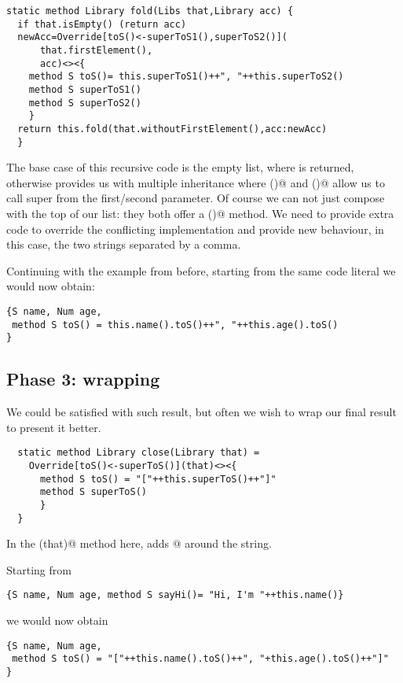 \begin{lstlisting}
static method Library fold(Libs that,Library acc) {
  if that.isEmpty() (return acc)
  newAcc=Override[toS()<-superToS1(),superToS2()](
      that.firstElement(),
      acc)<><{
    method S toS()= this.superToS1()++", "++this.superToS2()
    method S superToS1()
    method S superToS2()
    }
  return this.fold(that.withoutFirstElement(),acc:newAcc)
  }
\end{lstlisting}

The base case of this recursive code is the empty list, where \Q@acc@ is returned,
otherwise \Q@Override@ provides us with multiple inheritance where
()@ and ()@
allow us to call super from the first/second parameter.
Of course we can not just compose \Q@acc@ with the top of our list: they both offer
a \Q@toS()@ method. We need to provide extra code to override the conflicting implementation
and provide new behaviour, in this case, the two strings separated by a comma.

Continuing with the example from before, starting from the same code literal we would now obtain:

\begin{lstlisting}
{S name, Num age,
 method S toS() = this.name().toS()++", "++this.age().toS()
}
\end{lstlisting}

\subsection*{Phase 3: wrapping}
We could be satisfied with such result, but often we wish to wrap our final result
to present it better.

\begin{lstlisting}
  static method Library close(Library that) =
    Override[toS()<-superToS()](that)<><{
      method S toS() = "["++this.superToS()++"]"
      method S superToS()
      }
  }
\end{lstlisting}

  In the \Q@close(that)@ method here, \Q@Override@ adds \Q@[]@ around the string.

Starting from

\begin{lstlisting}
{S name, Num age, method S sayHi()= "Hi, I'm "++this.name()}
\end{lstlisting}

we would now obtain

\begin{lstlisting}
{S name, Num age,
 method S toS() = "["++this.name().toS()++", "+this.age().toS()++"]"
}
\end{lstlisting}

